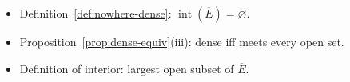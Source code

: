 \begin{remark*}[Dependencies]
\begin{itemize}
  \item Definition~\ref{def:nowhere-dense}: $\operatorname{int}(\overline{E}) = \varnothing$.
  \item Proposition~\ref{prop:dense-equiv}(iii): dense iff meets every open set.
  \item Definition of interior: largest open subset of $\overline{E}$.
\end{itemize}
\end{remark*}
